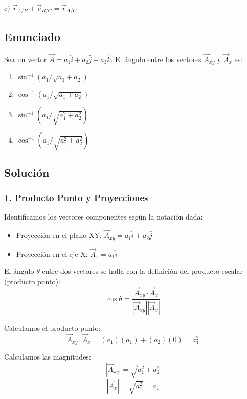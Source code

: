 \documentclass[12pt, a4paper]{article}
\begin{document}
\begin{tcolorbox}[colback=green!5!white, colframe=green!50!black, title=Respuesta Final]
\centering \Large c) $\vec{r}_{A/B} + \vec{r}_{B/C} = \vec{r}_{A/C}$
\end{tcolorbox}

\newpage


\subsection*{Enunciado}
Sea un vector $\vec{A} = a_1 \hat{i} + a_2 \hat{j} + a_3 \hat{k}$. El ángulo entre los vectores $\vec{A}_{xy}$ y $\vec{A}_x$ es:
\begin{enumerate}[label=\alph*)]
    \item $\sin^{-1}(a_1 / \sqrt{a_1 + a_2})$
    \item $\cos^{-1}(a_1 / \sqrt{a_1 + a_2})$
    \item $\sin^{-1}(a_1 / \sqrt{a_1^2 + a_2^2})$
    \item $\cos^{-1}(a_1 / \sqrt{a_1^2 + a_2^2})$
\end{enumerate}

\subsection*{Solución}

\subsubsection*{1. Producto Punto y Proyecciones}
Identificamos los vectores componentes según la notación dada:
\begin{itemize}
    \item Proyección en el plano XY: $\vec{A}_{xy} = a_1 \hat{i} + a_2 \hat{j}$
    \item Proyección en el eje X: $\vec{A}_x = a_1 \hat{i}$
\end{itemize}

El ángulo $\theta$ entre dos vectores se halla con la definición del producto escalar (producto punto):
$$ \cos \theta = \frac{\vec{A}_{xy} \cdot \vec{A}_x}{|\vec{A}_{xy}| |\vec{A}_x|} $$

Calculamos el producto punto:
$$ \vec{A}_{xy} \cdot \vec{A}_x = (a_1)(a_1) + (a_2)(0) = a_1^2 $$

Calculamos las magnitudes:
$$ |\vec{A}_{xy}| = \sqrt{a_1^2 + a_2^2} $$
$$ |\vec{A}_x| = \sqrt{a_1^2} = a_1 $$
\end{document}
